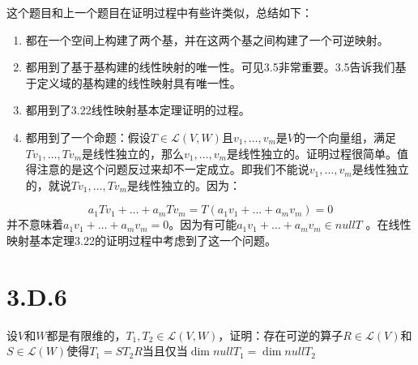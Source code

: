 \documentclass[10pt,a4paper,UTF8]{article}
\begin{document}
\begin{answer}
这个题目和上一个题目在证明过程中有些许类似，总结如下：
\begin{enumerate}
\item 都在一个空间上构建了两个基，并在这两个基之间构建了一个可逆映射。
\item 都用到了基于基构建的线性映射的唯一性。可见3.5非常重要。3.5告诉我们基于定义域的基构建的线性映射具有唯一性。
\item 都用到了3.22线性映射基本定理证明的过程。
\item 都用到了一个命题：假设\(T\in \mathcal{L}(V,W)\)且\(v_{1},\ldots ,v_{m}\)是\(V\)的一个向量组，满足\(Tv_{1},\ldots ,Tv_{m}\)是线性独立的，那么\(v_{1},\ldots ,v_{m}\)是线性独立的。证明过程很简单。值得注意的是这个问题反过来却不一定成立。即我们不能说\(v_{1},\ldots ,v_{m}\)是线性独立的，就说\(Tv_{1},\ldots ,Tv_{m}\)是线性独立的。因为：
\end{enumerate}
\begin{equation}
\label{eq:17}
a_{1}Tv_{1} + \ldots + a_{m}Tv_{m} = T(a_{1}v_{1} + \ldots + a_{m}v_{m}) = 0
\end{equation}
并不意味着\(a_{1}v_{1}+ \ldots + a_{m}v_{m}=0\)。因为有可能\(a_{1}v_{1}+ \ldots + a_{m}v_{m} \in nullT\) 。在线性映射基本定理3.22的证明过程中考虑到了这一个问题。
\end{answer}
\section{3.D.6}
\label{sec:org813592b}


\begin{problem}
设\(V\)和\(W\)都是有限维的，\(T_{1},T_{2}\in \mathcal{L}(V,W)\)，证明：存在可逆的算子\(R\in \mathcal{L}(V)\)和\(S\in \mathcal{L}(W)\)使得\(T_{1}= ST_{2}R\)当且仅当\(\dim nullT_{1} = \dim nullT_{2}\)
\end{problem}
\end{document}
